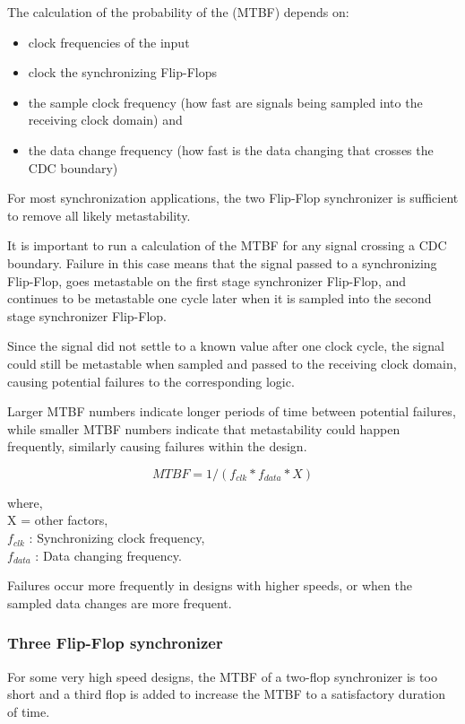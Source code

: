 The calculation of the probability of the (MTBF) depends on: 
\begin{itemize}
    \item clock frequencies of the input
    \item clock the synchronizing Flip-Flops
    \item the sample clock frequency (how fast are signals being sampled into the receiving clock domain) and
    \item the data change frequency (how fast is the data changing that crosses the CDC boundary)
\end{itemize}

For most synchronization applications, the two Flip-Flop synchronizer is sufficient to remove all likely metastability.

It is important to run a calculation of the MTBF for any signal crossing a CDC boundary. Failure in this case means that the signal passed to a synchronizing Flip-Flop, goes metastable on the first stage synchronizer Flip-Flop, and continues to be metastable one cycle later when it is sampled into the second stage synchronizer Flip-Flop. 

Since the signal did not settle to a known value after one clock cycle, the signal could still be metastable when sampled and passed to the receiving clock domain, causing potential failures to the corresponding logic.

Larger MTBF numbers indicate longer periods of time between potential failures, while smaller MTBF numbers indicate that metastability could happen frequently, similarly causing failures within the design.

\[MTBF = 1/(f_{clk} * f_{data} * X )\]

where,\\
X = other factors,\\
\(f_{clk}\) : Synchronizing clock frequency,\\
\(f_{data}\) : Data changing frequency.

\par Failures occur more frequently in designs with higher speeds, or when the sampled data changes are more frequent.


\subsubsection{Three Flip-Flop synchronizer}
For some very high speed designs, the MTBF of a two-flop synchronizer is too short and a third flop is added to increase the MTBF to a satisfactory duration of time. 

